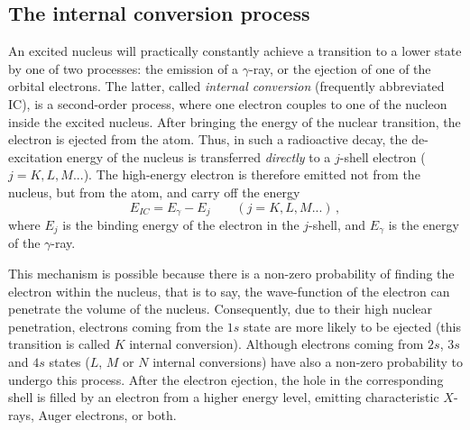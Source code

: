\subsection{The internal conversion process}

An excited nucleus will practically constantly achieve a transition to a lower state by one of two processes: the emission of a $\gamma$-ray, or the ejection of one of the orbital electrons.
The latter, called \emph{internal conversion} (frequently abbreviated IC), is a second-order process, where one electron couples to one of the nucleon inside the excited nucleus.
After bringing the energy of the nuclear transition, the electron is ejected from the atom.
Thus, in such a radioactive decay, the de-excitation energy of the nucleus is transferred \emph{directly} to a $j$-shell electron ($j=K,L,M...$).
The high-energy electron is therefore emitted not from the nucleus, but from the atom, and carry off the energy
\begin{equation}
E_{IC} = E_{\gamma}-E_{j}\qquad (j=K,L,M...)\,,
\end{equation}
where $E_{j}$ is the binding energy of the electron in the $j$-shell, and $E_{\gamma}$ is the energy of the $\gamma$-ray.

This mechanism is possible because there is a non-zero probability of finding the electron within the nucleus, that is to say, the wave-function of the electron can penetrate the volume of the nucleus.
Consequently, due to their high nuclear penetration, electrons coming from the $1s$ state are more likely to be ejected (this transition is called $K$ internal conversion).
Although electrons coming from $2s$, $3s$ and $4s$ states ($L$, $M$ or $N$ internal conversions) have also a non-zero probability to undergo this process.
After the electron ejection, the hole in the corresponding shell is filled by an electron from a higher energy level, emitting characteristic $X$-rays, Auger electrons, or both.

